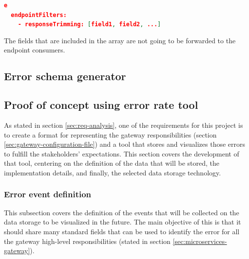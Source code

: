 \documentclass[english, 12pt, a4paper, sci, utf8, a-1b, online]{aaltothesis}
\begin{document}
\begin{lstlisting}[language=json,firstnumber=1]e
  endpointFilters:
    - responseTrimming: [field1, field2, ...]
\end{lstlisting}

The fields that are included in the array are not going to be forwarded to the endpoint consumers.


\subsection{Error schema generator} %


\subsection{Proof of concept using error rate tool}



As stated in section \ref{sec:req-analysis}, one of the requirements for this project is to create a format for representing the gateway responsibilities (section \ref{sec:gateway-configuration-file}) and a tool that stores and visualizes those errors to fulfill the stakeholders' expectations. This section covers the development of that tool, centering on the definition of the data that will be stored, the implementation details, and finally, the selected data storage technology.

\subsubsection{Error event definition}
\label{sec:error-event-definition}

This subsection covers the definition of the events that will be collected on the data storage to be visualized in the future. The main objective of this is that it should share many standard fields that can be used to identify the error for all the gateway high-level responsibilities (stated in section \ref{sec:microservices-gateway}).\\
\end{document}
